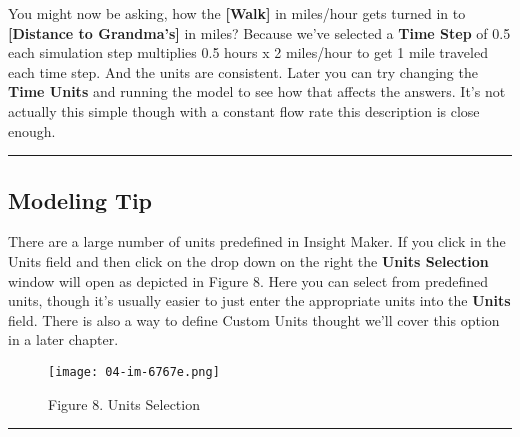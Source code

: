 \documentclass[]{memoir}
\makeatletter
\def\maxwidth{\ifdim\Gin@nat@width>\linewidth\linewidth
\else\Gin@nat@width\fi}
\let\Oldincludegraphics\includegraphics
\renewcommand{\includegraphics}[1]{\Oldincludegraphics[width=\maxwidth]{#1}}
\newcommand{\p}[1]{\textbf{{[}#1{]}}}
\renewcommand{\u}[1]{\textbf{#1}}
\renewcommand{\a}[1]{\textbf{#1}}
\makeatother
\begin{document}
You might now be asking, how the \p{Walk} in miles/hour gets turned in
to \p{Distance to Grandma's} in miles? Because we've selected a
\a{Time Step} of 0.5 each simulation step multiplies 0.5 hours x 2
miles/hour to get 1 mile traveled each time step. And the units are
consistent. Later you can try changing the \u{Time Units} and running
the model to see how that affects the answers. It's not actually this
simple though with a constant flow rate this description is close
enough.

\begin{center}\rule{3in}{0.4pt}\end{center}

\subsection{Modeling Tip}

There are a large number of units predefined in Insight Maker. If you
click in the Units field and then click on the drop down on the right
the \u{Units Selection} window will open as depicted in Figure 8. Here
you can select from predefined units, though it's usually easier to just
enter the appropriate units into the \a{Units} field. There is also a
way to define Custom Units thought we'll cover this option in a later
chapter.

\begin{figure}[htbp]
\centering
\texttt{[image: 04-im-6767e.png]}
\caption{Figure 8. Units Selection}
\end{figure}

\begin{center}\rule{3in}{0.4pt}\end{center}

\FloatBarrier 
\end{document}
